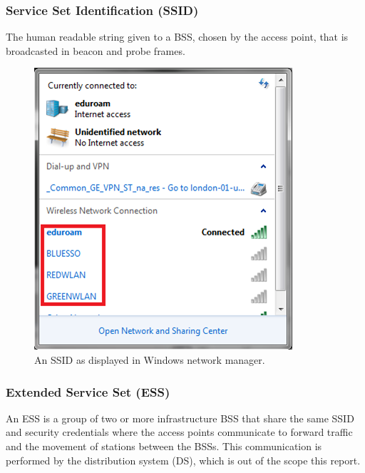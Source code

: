 \subsubsection*{Service Set Identification (SSID)}
The human readable  string given to a BSS, chosen by the access point, that is broadcasted in beacon and probe frames. 
\begin{figure}[htb!]
\centering\includegraphics{intro/diagrams/ssid.png}
\caption{An SSID as displayed in Windows network manager.}
\end{figure}

\subsubsection*{Extended Service Set (ESS)}
An ESS is a group of two or more infrastructure BSS that share the same SSID and security credentials where the access points communicate to forward traffic and the movement of stations between the BSSs. This communication is performed by the distribution system (DS), which is out of the scope this report.

